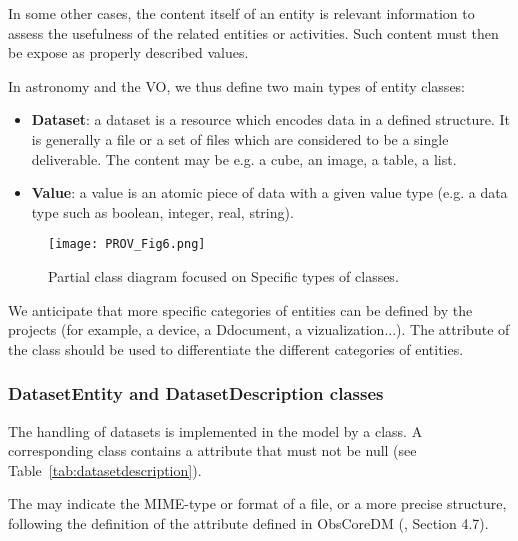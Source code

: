 In some other cases, the content itself of an entity is relevant information to assess the usefulness of the related entities or activities. Such content must then be expose as properly described values.

In astronomy and the VO, we thus define two main types of entity classes:

\begin{itemize}
    \item \textbf{Dataset}: a dataset is a resource which encodes data in a defined structure. It is generally a file or a set of files which are considered to be a single deliverable. The content may be e.g. a cube, an image, a table, a list.
    \item \textbf{Value}: a value is an atomic piece of data with a given value type (e.g. a data type such as boolean, integer, real, string).
\end{itemize}


\begin{figure}[ht]
\centering
\texttt{[image: PROV\_Fig6.png]}
\caption[Partial class diagram focused on specific types of  classes.]{Partial class diagram focused on Specific types of  classes.}
\label{fig:classdiagram_entityclasses}
\end{figure}

We anticipate that more specific categories of entities can be defined by the projects (for example, a device, a Ddocument, a vizualization...). The  attribute of the  class should be used to differentiate the different categories of entities.


\subsubsection{DatasetEntity and DatasetDescription classes}

The handling of datasets is implemented in the model by a  class. A corresponding  class contains a  attribute that must not be null (see Table~\ref{tab:datasetdescription}).

The  may indicate the MIME-type or format of a file, or a more precise structure, following the definition of the attribute  defined in ObsCoreDM (\citet{2017ivoa.spec.0509L}, Section 4.7).

